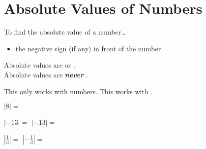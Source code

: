 \section{Absolute Values of Numbers}


\begin{myConcept}{To find the absolute value of a number\dots}
    \begin{itemize}
        \item {} the negative sign (if any) in front of the number.
    \end{itemize}
    \begin{tcolorbox}[center,width=5in,]
        Absolute values are  or .\\[0.25\baselineskip]
        Absolute values are {\bfseries\itshape never} .
    \end{tcolorbox}
    \begin{tcolorbox}[center,width=5in,]
        This only works with numbers.
        This  works with .
    \end{tcolorbox}
\end{myConcept}

{
    $|8|=$   
}

\myProblemsWithContent
{
    $|-13|=$   
}
{
    $|-13|=$   
}

\myProblemsWithContent
{
    $|\frac{1}{3}|=$   
}
{
    $|-\frac{1}{3}|=$   
}
